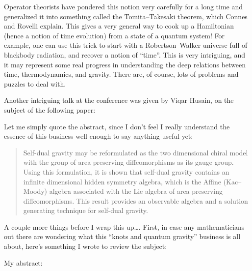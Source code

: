 \documentclass{article}
\def\tightlist{}
\renewcommand{\texttt}[1]{%
  \begingroup
  \ttfamily
  \begingroup\lccode`~=`/\lowercase{\endgroup\def~}{/\discretionary{}{}{}}%
  \begingroup\lccode`~=`[\lowercase{\endgroup\def~}{[\discretionary{}{}{}}%
  \begingroup\lccode`~=`.\lowercase{\endgroup\def~}{.\discretionary{}{}{}}%
  \catcode`/=\active\catcode`[=\active\catcode`.=\active
  \scantokens{#1\noexpand}%
  \endgroup
}
\begin{document}
Operator theorists have pondered this notion very carefully for a long
time and generalized it into something called the Tomita--Takesaki
theorem, which Connes and Rovelli explain. This gives a very general way
to cook up a Hamiltonian (hence a notion of time evolution) from a state
of a quantum system! For example, one can use this trick to start with a
Robertson--Walker universe full of blackbody radiation, and recover a
notion of ``time''. This is very intriguing, and it may represent some
real progress in understanding the deep relations between time,
thermodynamics, and gravity. There are, of course, lots of problems and
puzzles to deal with.

Another intriguing talk at the conference was given by Viqar Husain, on
the subject of the following paper:

\noindent
Let me simply quote the abstract, since I don't feel I really understand
the essence of this business well enough to say anything useful yet:

\begin{quote}
Self-dual gravity may be reformulated as the two dimensional chiral
model with the group of area preserving diffeomorphisms as its gauge
group. Using this formulation, it is shown that self-dual gravity
contains an infinite dimensional hidden symmetry algebra, which is the
Affine (Kac--Moody) algebra associated with the Lie algebra of area
preserving diffeomorphisms. This result provides an observable algebra
and a solution generating technique for self-dual gravity.
\end{quote}

A couple more things before I wrap this up\ldots. First, in case any
mathematicians out there are wondering what this ``knots and quantum
gravity'' business is all about, here's something I wrote to review the
subject:

\noindent
My abstract:
\end{document}
